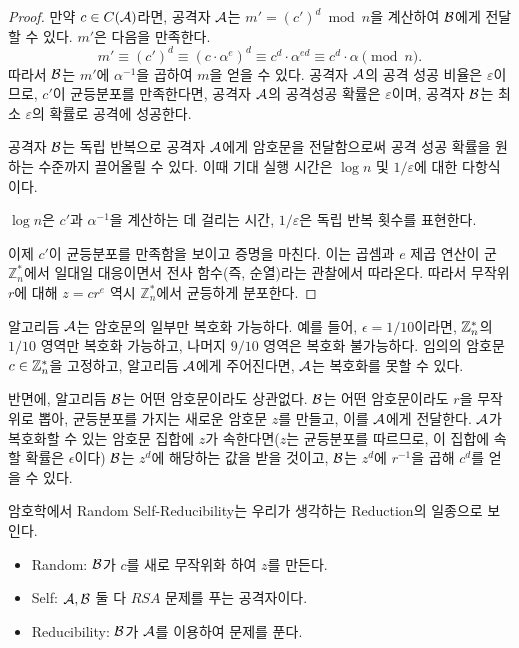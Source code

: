 \begin{proof}
    만약 $c \in C(\mathcal{A})$라면, 공격자 $\mathcal{A}$는 $m' = (c')^d \bmod n$을 계산하여
    $\mathcal{B}$에게 전달할 수 있다. $m'$은 다음을 만족한다.
    $$
        m' \equiv (c')^d 
        \equiv (c \cdot \alpha^e)^d 
        \equiv c^d \cdot \alpha^{ed} 
        \equiv c^d \cdot \alpha \pmod n.
    $$
    따라서 $\mathcal{B}$는 $m'$에 $\alpha^{-1}$을 곱하여 $m$을 얻을 수 있다. 공격자
    $\mathcal{A}$의 공격 성공 비율은 $\varepsilon$이므로, $c'$이 균등분포를 만족한다면,
    공격자 $\mathcal{A}$의 공격성공 확률은 $\varepsilon$이며, 공격자 $\mathcal{B}$는 최소
    $\varepsilon$의 확률로 공격에 성공한다. 

    공격자 $\mathcal{B}$는 독립 반복으로 공격자 $\mathcal{A}$에게 암호문을 전달함으로써 공격
    성공 확률을 원하는 수준까지 끌어올릴 수 있다. 이때 기대 실행 시간은 $\log n$
    및 $1/\varepsilon$에 대한 다항식이다.

    \begin{memo}
        $\log n$은 $c'$과 $\alpha^{-1}$을 계산하는 데 걸리는 시간,
        $1/\varepsilon$은 독립 반복 횟수를 표현한다.
    \end{memo}

    이제 $c'$이 균등분포를 만족함을 보이고 증명을 마친다. 이는 곱셈과 $e$ 제곱
    연산이 군 $\mathbb{Z}_n^*$에서 일대일 대응이면서 전사 함수(즉, 순열)라는
    관찰에서 따라온다. 따라서 무작위 $r$에 대해 $z = cr^e$ 역시
    $\mathbb{Z}_n^*$에서 균등하게 분포한다.
\end{proof}

\begin{memo}
    알고리듬 $\mathcal{A}$는 암호문의 일부만 복호화 가능하다. 예를 들어, $\epsilon =
    1/10$이라면, $\mathbb{Z}^*_n$의 $1/10$ 영역만 복호화 가능하고, 나머지 $9/10$ 영역은
    복호화 불가능하다. 임의의 암호문 $c \in \mathbb{Z}^*_n$을 고정하고, 알고리듬
    $\mathcal{A}$에게 주어진다면, $\mathcal{A}$는 복호화를 못할 수 있다.

    반면에, 알고리듬 $\mathcal{B}$는 어떤 암호문이라도 상관없다. $\mathcal{B}$는 어떤 암호문이라도
    $r$을 무작위로 뽑아, 균등분포를 가지는 새로운 암호문 $z$를 만들고, 이를
    $\mathcal{A}$에게 전달한다. $\mathcal{A}$가 복호화할 수 있는 암호문 집합에 $z$가
    속한다면($z$는 균등분포를 따르므로, 이 집합에 속할 확률은 $\epsilon$이다) $\mathcal{B}$는 $z^d$에 해당하는 값을 받을
    것이고, $\mathcal{B}$는 $z^d$에 $r^{-1}$을 곱해 $c^d$를 얻을 수 있다.
\end{memo}

\begin{memo}
    암호학에서 Random Self-Reducibility는 우리가 생각하는 Reduction의 일종으로
    보인다.
    \begin{itemize}
        \item Random: $\mathcal{B}$가 $c$를 새로 무작위화 하여 $z$를 만든다.
        \item Self: $\mathcal{A}, \mathcal{B}$ 둘 다 $RSA$ 문제를 푸는 공격자이다.
        \item Reducibility: $\mathcal{B}$가 $\mathcal{A}$를 이용하여 문제를 푼다.
    \end{itemize}
\end{memo}

